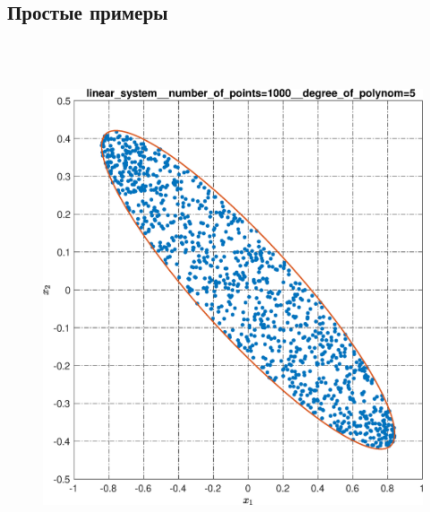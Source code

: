 \documentclass[../main.tex]{subfiles}
\begin{document}
  \subsection{Простые примеры}
  \begin{figure}[ht!] 
  	\hspace{-2.5ex}
  	\begin{minipage}[b]{.4\linewidth} 
  		\small
  		\centering 
  		\includegraphics[width=\linewidth]{images/linear_system__number_of_points=1000__degree_of_polynom=5.eps}
  	\end{minipage}
  	\hfill
  	\begin{minipage}[b]{.4\linewidth} 
  		\small
  		\centering

\end{minipage}
\end{figure}
\end{document}

